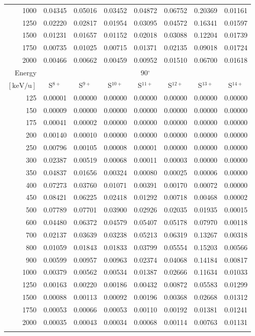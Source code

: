 \begin{longtable}{r|c|c|c|c|c|c|c}
     1000 & 0.04345 & 0.05016 & 0.03452 & 0.04872 & 0.06752 & 0.20369 & 0.01161 \\
     1250 & 0.02220 & 0.02817 & 0.01954 & 0.03095 & 0.04572 & 0.16341 & 0.01597 \\
     1500 & 0.01231 & 0.01657 & 0.01152 & 0.02018 & 0.03088 & 0.12204 & 0.01739 \\
     1750 & 0.00735 & 0.01025 & 0.00715 & 0.01371 & 0.02135 & 0.09018 & 0.01724 \\
     2000 & 0.00466 & 0.00662 & 0.00459 & 0.00952 & 0.01510 & 0.06700 & 0.01618 \\
     \cline{1-8}
    Energy & \multicolumn{7}{c}{90$^\circ$} \\ \cline{2-8}
    $\mathrm{[keV/u]}$ & S$^{8+}$ & S$^{9+}$ & S$^{10+}$ & S$^{11+}$ & S$^{12+}$ & S$^{13+}$ & S$^{14+}$ \\ \cline{1-8}
      125 & 0.00001 & 0.00000 & 0.00000 & 0.00000 & 0.00000 & 0.00000 & 0.00000 \\
      150 & 0.00009 & 0.00000 & 0.00000 & 0.00000 & 0.00000 & 0.00000 & 0.00000 \\
      175 & 0.00041 & 0.00002 & 0.00000 & 0.00000 & 0.00000 & 0.00000 & 0.00000 \\
      200 & 0.00140 & 0.00010 & 0.00000 & 0.00000 & 0.00000 & 0.00000 & 0.00000 \\
      250 & 0.00796 & 0.00105 & 0.00008 & 0.00001 & 0.00000 & 0.00000 & 0.00000 \\
      300 & 0.02387 & 0.00519 & 0.00068 & 0.00011 & 0.00003 & 0.00000 & 0.00000 \\
      350 & 0.04837 & 0.01656 & 0.00324 & 0.00080 & 0.00025 & 0.00006 & 0.00000 \\
      400 & 0.07273 & 0.03760 & 0.01071 & 0.00391 & 0.00170 & 0.00072 & 0.00000 \\
      450 & 0.08421 & 0.06225 & 0.02418 & 0.01292 & 0.00718 & 0.00468 & 0.00002 \\
      500 & 0.07789 & 0.07701 & 0.03900 & 0.02926 & 0.02035 & 0.01935 & 0.00015 \\
      600 & 0.04480 & 0.06372 & 0.04579 & 0.05407 & 0.05178 & 0.07970 & 0.00118 \\
      700 & 0.02137 & 0.03639 & 0.03238 & 0.05213 & 0.06319 & 0.13267 & 0.00318 \\
      800 & 0.01059 & 0.01843 & 0.01833 & 0.03799 & 0.05554 & 0.15203 & 0.00566 \\
      900 & 0.00599 & 0.00957 & 0.00963 & 0.02374 & 0.04068 & 0.14184 & 0.00817 \\
     1000 & 0.00379 & 0.00562 & 0.00534 & 0.01387 & 0.02666 & 0.11634 & 0.01033 \\
     1250 & 0.00163 & 0.00220 & 0.00186 & 0.00432 & 0.00872 & 0.05583 & 0.01299 \\
     1500 & 0.00088 & 0.00113 & 0.00092 & 0.00196 & 0.00368 & 0.02668 & 0.01312 \\
     1750 & 0.00053 & 0.00066 & 0.00053 & 0.00110 & 0.00192 & 0.01381 & 0.01241 \\
     2000 & 0.00035 & 0.00043 & 0.00034 & 0.00068 & 0.00114 & 0.00763 & 0.01131 \\ \cline{1-8}
    \label{tab:XRayEffOCX1}
\end{longtable}

